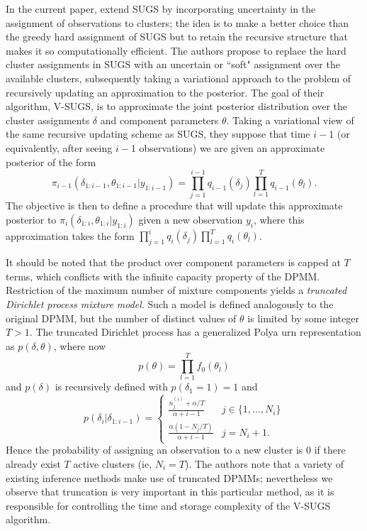 \documentclass{uwstat572}
\begin{document}
In the current paper, \cite{zhang} extend SUGS by incorporating uncertainty in the assignment of observations to clusters; the idea is to make a better choice than the greedy hard assignment of SUGS but to retain the recursive structure that makes it so computationally efficient. The authors propose to replace the hard cluster assignments in SUGS with an uncertain or ``soft" assignment over the available clusters, subsequently taking a variational approach to the problem of recursively updating an approximation to the posterior. The goal of their algorithm, V-SUGS, is to approximate the joint posterior distribution over the cluster assignments $\delta$ and component parameters $\theta$. Taking a variational view of the same recursive updating scheme as SUGS, they suppose that time $i-1$ (or equivalently, after seeing $i-1$ observations) we are given an approximate posterior of the form
$$ \pi_{i-1}(\delta_{1:i-1},\theta_{1:i-1} | y_{1:i-1}) = \prod_{j=1}^{i-1} q_{i-1}(\delta_j) \prod_{l=1}^T q_{i-1}(\theta_l).$$
The objective is then to define a procedure that will update this approximate posterior to $\pi_{i}(\delta_{1:i},\theta_{1:i} | y_{1:i})$ given a new observation $y_i$, where this approximation takes the form $\prod_{j=1}^{i} q_{i}(\delta_j) \prod_{l=1}^T q_{i}(\theta_l)$.

It should be noted that the product over component parameters is capped at $T$ terms, which conflicts with the infinite capacity property of the DPMM. Restriction of the maximum number of mixture components yields a \emph{truncated Dirichlet process mixture model}. Such a model is defined analogously to the original DPMM, but the number of distinct values of $\theta$ is limited by some integer $T > 1$. The truncated Dirichlet process has a generalized Polya urn representation as $p(\delta,\theta)$, where now
$$ p(\theta) = \prod_{l=1}^T f_0(\theta_l)$$
and $p(\delta)$ is recursively defined with $p(\delta_1 = 1) =1$ and 
\[ p(\delta_i | \delta_{1:i-1}) = \begin{cases} 
      \frac{n_j^{(i)}+\alpha/T}{\alpha+i-1}& j \in \{1,...,N_i\} \\
      \frac{\alpha(1-N_j/T)}{\alpha+i-1} & j = N_i +1.
   \end{cases}
\]
Hence the probability of assigning an observation to a new cluster is $0$ if there already exist $T$ active clusters (ie, $N_i = T$). The authors note that a variety of existing inference methods make use of truncated DPMMs; nevertheless we observe that truncation is very important in this particular method, as it is responsible for controlling the time and storage complexity of the V-SUGS algorithm.
\end{document}
